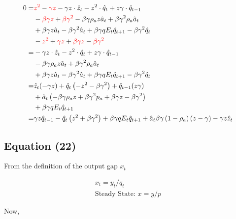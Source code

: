 \documentclass[11pt,preprint, authoryear]{elsarticle}
\numberwithin{equation}{section}
\numberwithin{figure}{section}
\numberwithin{table}{section}
\begin{document}
\[\begin{aligned}
0 = & \begingroup\color{red}z^{2} \endgroup - \begingroup \color{red} {\gamma z} \endgroup - \gamma z \cdot \hat{z}_t - z^{2} \cdot \hat{q}_t 
+ z \gamma \cdot \hat{q}_{t-1}\\
& - \begingroup \color{red}{\beta \gamma z} \endgroup + \begingroup \color{red}{\beta \gamma^{2}} \endgroup - \beta \gamma \rho_{a} z \hat{a}_{t} + \beta \gamma^{2} \rho_{a} \hat{a}_{t}\\
& + \beta \gamma z \hat{a}_{t} - \beta \gamma^{2} \hat{a}_{t}
+\beta \gamma q E_{t} \hat{q}_{t+1}-\beta \gamma^{2} \hat{q}_{t} \\
& - \begingroup \color{red}{z^2} \endgroup + \begingroup \color{red}{\gamma z} \endgroup + \begingroup \color{red}{\beta \gamma z} \endgroup - \begingroup \color{red}{\beta \gamma^2} \endgroup \\
=& - \gamma z \cdot \hat{z}_t 
- z^{2} \cdot \hat{q}_t 
+ z \gamma \cdot \hat{q}_{t-1}\\
&-\beta \gamma \rho_{a} z \hat{a}_{t}+\beta \gamma^{2} \rho_{a} \hat{a}_{t}\\
&+\beta \gamma z \hat{a}_{t}-\beta \gamma^{2} \hat{a}_{t}
+\beta \gamma q E_{t} \hat{q}_{t+1}-\beta \gamma^{2} \hat{q}_{t} \\
= & \hat{z}_{t}(-\gamma z)+\hat{q}_{t}\left(-z^{2}-\beta \gamma^{2}\right)+\hat{q}_{t-1}(z \gamma) \\
&+\hat{a}_{t}\left(-\beta \gamma \rho_{a} z+\beta \gamma^{2} p_{a}+\beta \gamma z-\beta \gamma^{2}\right) \\
&+\beta \gamma q E_{t} \hat{q}_{t+1}\\
= & \gamma z \hat{q}_{t-1}-\hat{q}_{t}\left(z^{2}+\beta \gamma^{2}\right)+\beta \gamma q E_{t} \hat{q}_{t+1}+\hat{a}_{t} \beta \gamma\left(1-\rho_{a}\right)(z-\gamma)-\gamma z \hat{z}_{t}
\end{aligned}\]

\hypertarget{equation-22}{%
\subsection{Equation (22)}\label{equation-22}}

From the definition of the output gap \(x_t\)

\[\begin{aligned} x_{t}=y_{t} / q_{t} \\
\text{Steady State: } x = y/p \end{aligned}\]

Now,
\end{document}
